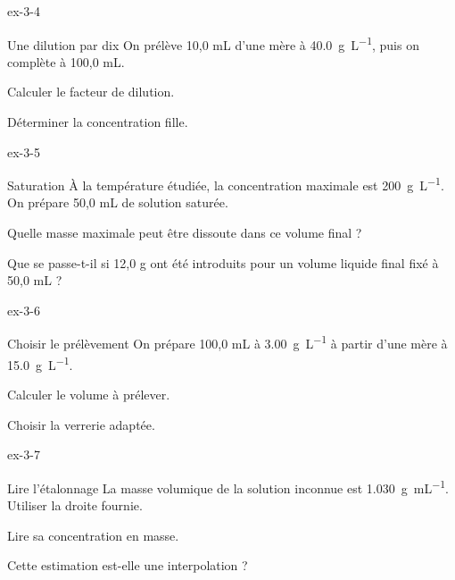 \begin{blocLivre}{ex-3-4}\begin{exercice}[1]{Une dilution par dix}
On prélève 10,0 mL d’une mère à \qty{40,0}{g.L^{-1}}, puis on complète à 100,0 mL.
\begin{questions}
\item Calculer le facteur de dilution.
\item Déterminer la concentration fille.
\end{questions}
\end{exercice}\end{blocLivre}
\begin{blocLivre}{ex-3-5}\begin{exercice}[2]{Saturation}
À la température étudiée, la concentration maximale est \qty{200}{g.L^{-1}}. On prépare 50,0 mL de solution saturée.
\begin{questions}
\item Quelle masse maximale peut être dissoute dans ce volume final ?
\item Que se passe-t-il si 12,0 g ont été introduits pour un volume liquide final fixé à 50,0 mL ?
\end{questions}
\end{exercice}\end{blocLivre}
\begin{blocLivre}{ex-3-6}\begin{exercice}[2]{Choisir le prélèvement}
On prépare 100,0 mL à \qty{3,00}{g.L^{-1}} à partir d’une mère à \qty{15,0}{g.L^{-1}}.
\begin{questions}
\item Calculer le volume à prélever.
\item Choisir la verrerie adaptée.
\end{questions}
\end{exercice}\end{blocLivre}
\begin{blocLivre}{ex-3-7}\begin{exercice}[2]{Lire l’étalonnage}
La masse volumique de la solution inconnue est \qty{1,030}{g.mL^{-1}}. Utiliser la droite fournie.
\begin{questions}
\item Lire sa concentration en masse.
\item Cette estimation est-elle une interpolation ?
\end{questions}
\end{exercice}\end{blocLivre}
